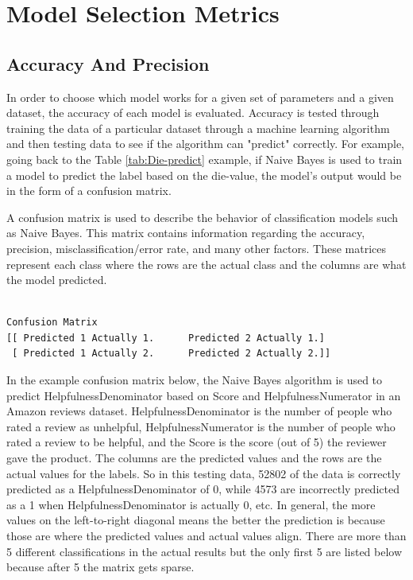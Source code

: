 \documentclass[9pt,twocolumn,twoside]{idsi}
\begin{document}
\section{Model Selection Metrics} \label{modelMetrics}

\subsection{Accuracy And Precision}
In order to choose which model works for a given set of parameters and a given dataset, the accuracy of each model is evaluated. Accuracy is tested through training the data of a particular dataset through a machine learning algorithm and then testing data to see if the algorithm can "predict" correctly. For example, going back to the Table \ref{tab:Die-predict} example, if Naive Bayes is used to train a model to predict the label based on the die-value, the model's output would be in the form of a confusion matrix. 

A confusion matrix is used to describe the behavior of classification models such as Naive Bayes. This matrix contains information regarding the accuracy, precision, misclassification/error rate, and many other factors. These matrices represent each class where the rows are the actual class and the columns are what the model predicted. 
\begin{verbatim}

Confusion Matrix
[[ Predicted 1 Actually 1.		Predicted 2 Actually 1.]
 [ Predicted 1 Actually 2.  	Predicted 2 Actually 2.]]

\end{verbatim}

In the example confusion matrix below, the Naive Bayes algorithm is used to predict HelpfulnessDenominator based on Score and HelpfulnessNumerator in an Amazon reviews dataset. HelpfulnessDenominator is the number of people who rated a review as unhelpful, HelpfulnessNumerator is the number of people who rated a review to be helpful, and the Score is the score (out of 5) the reviewer gave the product. The columns are the predicted values and the rows are the actual values for the labels. So in this testing data, 52802 of the data is correctly predicted as a HelpfulnessDenominator of 0, while 4573 are incorrectly predicted as a 1 when HelpfulnessDenominator is actually 0, etc. In general, the more values on the left-to-right diagonal means the better the prediction is because those are where the predicted values and actual values align. There are more than 5 different classifications in the actual results but the only first 5 are listed below because after 5 the matrix gets sparse.
\end{document}
